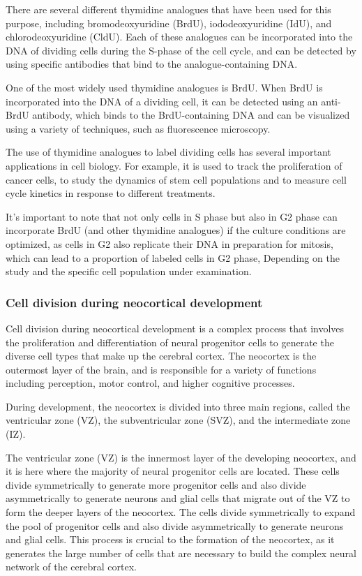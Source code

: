 \begin{itemize}
\begin{itemize}
There are several different thymidine analogues that have been used for this purpose, including bromodeoxyuridine (BrdU), iododeoxyuridine (IdU), and chlorodeoxyuridine (CldU). Each of these analogues can be incorporated into the DNA of dividing cells during the S-phase of the cell cycle, and can be detected by using specific antibodies that bind to the analogue-containing DNA.

One of the most widely used thymidine analogues is BrdU. When BrdU is incorporated into the DNA of a dividing cell, it can be detected using an anti-BrdU antibody, which binds to the BrdU-containing DNA and can be visualized using a variety of techniques, such as fluorescence microscopy.

The use of thymidine analogues to label dividing cells has several important applications in cell biology. For example, it is used to track the proliferation of cancer cells, to study the dynamics of stem cell populations and to measure cell cycle kinetics in response to different treatments.

It's important to note that not only cells in S phase but also in G2 phase can incorporate BrdU (and other thymidine analogues) if the culture conditions are optimized, as cells in G2 also replicate their DNA in preparation for mitosis, which can lead to a proportion of labeled cells in G2 phase, Depending on the study and the specific cell population under examination.
\subsubsection{Cell division during neocortical development}
Cell division during neocortical development is a complex process that involves the proliferation and differentiation of neural progenitor cells to generate the diverse cell types that make up the cerebral cortex. The neocortex is the outermost layer of the brain, and is responsible for a variety of functions including perception, motor control, and higher cognitive processes.

During development, the neocortex is divided into three main regions, called the ventricular zone (VZ), the subventricular zone (SVZ), and the intermediate zone (IZ).

The ventricular zone (VZ) is the innermost layer of the developing neocortex, and it is here where the majority of neural progenitor cells are located. These cells divide symmetrically to generate more progenitor cells and also divide asymmetrically to generate neurons and glial cells that migrate out of the VZ to form the deeper layers of the neocortex. The cells divide symmetrically to expand the pool of progenitor cells and also divide asymmetrically to generate neurons and glial cells. This process is crucial to the formation of the neocortex, as it generates the large number of cells that are necessary to build the complex neural network of the cerebral cortex.


\end{itemize}
\end{itemize}
